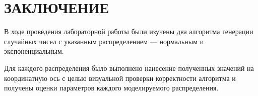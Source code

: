 \section*{ЗАКЛЮЧЕНИЕ}

В ходе проведения лабораторной работы были изучены два алгоритма
генерации случайных чисел с указанным распределением --- нормальным и экспоненциальным.

Для каждого распределения было выполнено нанесение полученных значений на
координатную ось с целью визуальной проверки корректности алгоритма и 
получены оценки параметров каждого моделируемого распределения.

\newpage
